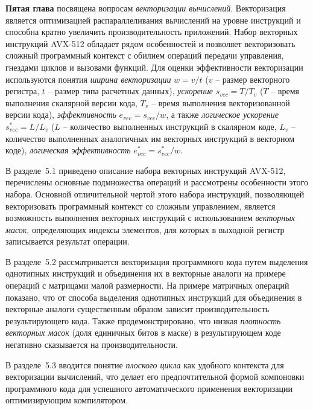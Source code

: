 \documentclass[a4paper,14pt]{extarticle}                     %
\theoremstyle{plain}                                         %
\begin{document}
\newpage
\textbf{Пятая глава} посвящена вопросам \textit{векторизации вычислений}.
Векторизация является оптимизацией распараллеливания вычислений на уровне инструкций и способна кратно увеличить производительность приложений.
Набор векторных инструкций AVX-512 обладает рядом особенностей и позволяет векторизовать сложный программный контекст с обилием операций передачи управления, гнездами циклов и вызовами функций.
Для оценки эффективности векторизации используются понятия \textit{ширина векторизации} $w = v/t$ ($v$ -- размер векторного регистра, $t$ -- размер типа расчетных данных), \textit{ускорение} $s_{vec} = T/T_v$ ($T$ -- время выполнения скалярной версии кода, $T_v$ -- время выполнения векторизованной версии кода), \textit{эффективность} $e_{vec} = s_{vec}/w$, а также \textit{логическое ускорение} $s_{vec}^{*} = L/L_v$ ($L$ -- количество выполненных инструкций в скалярном коде, $L_v$ -- количество выполненных аналогичных им векторных инструкций в векторном коде), \textit{логическая эффективность} $e_{vec}^{*} = s_{vec}^{*}/w$.


В разделе~5.1 приведено описание набора векторных инструкций AVX-512, перечислены основные подмножества операций и рассмотрены особенности этого набора.
Основной отличительной чертой этого набора инструкций, позволяющей векторизовать программный контекст со сложным управлением, является возможность выполнения векторных инструкций с использованием \textit{векторных масок}, определяющих индексы элементов, для которых в выходной регистр записывается результат операции.


В разделе~5.2 рассматривается векторизация программного кода путем выделения однотипных инструкций и объединения их в векторные аналоги на примере операций с матрицами малой размерности.
На примере матричных операций показано, что от способа выделения однотипных инструкций для объединения в векторные аналоги существенным образом зависит производительность результирующего кода.
Также продемонстрировано, что низкая \textit{плотность векторных масок} (доля единичных битов в маске) в результирующем коде негативно сказывается на производительности.


В разделе~5.3 вводится понятие \textit{плоского цикла} как удобного контекста для векторизации вычислений, что делает его предпочтительной формой компоновки программного кода для успешного автоматического применения векторизации оптимизирующим компилятором.
\end{document}
